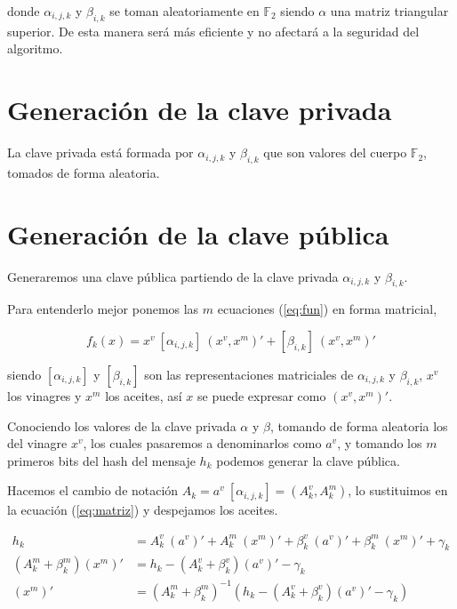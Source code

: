 \documentclass[11pt]{article}
\begin{document}
donde $\alpha_{i,j,k}$ y $\beta_{i,k}$ se toman aleatoriamente en $\mathds{F}_2$ siendo $\alpha$ una matriz triangular superior. De esta manera será más eficiente y no afectará a la seguridad del algoritmo.



\section{Generación de la clave privada}
La clave privada está formada por $\alpha_{i,j,k}$ y $\beta_{i,k}$ que son valores del cuerpo $\mathds{F}_2$, tomados de forma aleatoria.


\section{Generación de la clave pública}
Generaremos una clave pública partiendo de la clave privada $\alpha_{i,j,k}$ y $\beta_{i,k}$.

Para entenderlo mejor ponemos las $m$ ecuaciones (\ref{eq:fun}) en forma matricial,

\begin{equation}\label{eq:matriz} 
f_k(x) = x^v\ [\alpha_{i,j,k}]\ (x^v, x^m)' + [\beta_{i,k}]\ (x^v, x^m)'
\end{equation}

siendo $[\alpha_{i,j,k}]$ y $[\beta_{i,k}]$ son las representaciones matriciales de $\alpha_{i,j,k}$ y $\beta_{i,k}$, $x^v$ los vinagres y $x^m$ los aceites, así $x$ se puede expresar como $(x^v, x^m)'$.

Conociendo los valores de la clave privada $\alpha$ y $\beta$, tomando de forma aleatoria los del vinagre $x^v$, los cuales pasaremos a denominarlos como $a^v$, y tomando los $m$ primeros bits del hash del mensaje $h_k$ podemos generar la clave pública.

Hacemos el cambio de notación $A_k = a^v\ [\alpha_{i,j,k}] = (A^v_k, A^m_k)$,  lo sustituimos en la ecuación (\ref{eq:matriz}) y despejamos los aceites.

\begin{align}
h_k &= A_k^v\ (a^v)' +  A_k^m\ (x^m)' + \beta_k^v\ (a^v)' + \beta_k^m\ (x^m)' + \gamma_k\\
(A_k^m + \beta_k^m) (x^m)' &= h_k - (A_k^v + \beta_k^v) (a^v)' -\gamma_k\\
\label{eq:despeje}
(x^m)' &= (A_k^m + \beta_k^m)^{-1} (h_k - (A_k^v + \beta_k^v) (a^v)' -\gamma_k)
\end{align}
\end{document}
